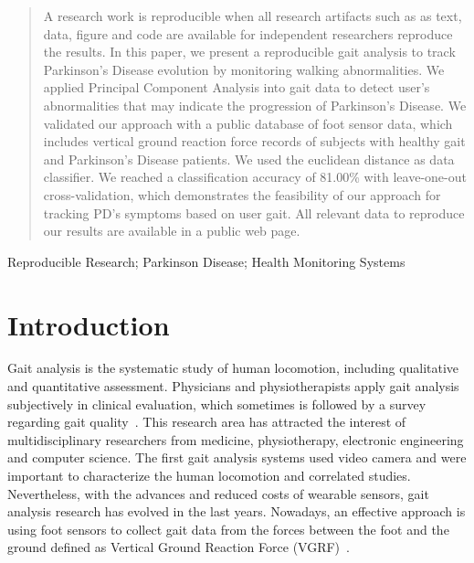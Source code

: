 \documentclass[10pt, conference, compsocconf]{IEEEtran}
\begin{document}




\maketitle


\begin{abstract}
A research work is reproducible when all research artifacts such as as text, data, figure and code are available for independent researchers reproduce the results. In this paper, we present a reproducible gait analysis to track Parkinson's Disease evolution by monitoring walking abnormalities. We applied Principal Component Analysis into gait data to detect user's abnormalities that may indicate the progression of Parkinson's Disease. We validated our approach with a public database of foot sensor data, which includes vertical ground reaction force records of subjects with healthy gait and Parkinson's Disease patients. We used the euclidean distance as data classifier. We reached a classification accuracy of 81.00\% with leave-one-out cross-validation, which demonstrates the feasibility of our approach for tracking PD's symptoms based on user gait. All relevant data to reproduce our results are available in a public web page.
\end{abstract}

\begin{IEEEkeywords}
Reproducible Research; Parkinson Disease; Health Monitoring Systems
\end{IEEEkeywords}


%
\IEEEpeerreviewmaketitle



\section{Introduction}
Gait analysis is the systematic study of human locomotion, including qualitative and quantitative assessment. Physicians and physiotherapists apply gait analysis subjectively in clinical evaluation, which sometimes is followed by a survey regarding gait quality~\cite{gait2014}. This research area has attracted the interest of multidisciplinary researchers from medicine, physiotherapy, electronic engineering and computer science. The first gait analysis systems used video camera and were important to characterize the human locomotion and correlated studies. Nevertheless, with the advances and reduced costs of wearable sensors, gait analysis research has evolved in the last years. Nowadays, an effective approach is using foot sensors to collect gait data from the forces between the foot and the ground defined as Vertical Ground Reaction Force (VGRF)~\cite{neumankensiology}. 
\end{document}
